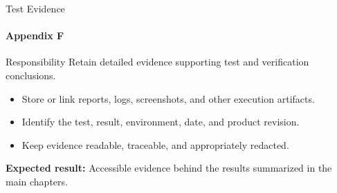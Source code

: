 \begin{frame}{Test Evidence}
\framesubtitle{Appendix F}
\begin{block}{Responsibility}
Retain detailed evidence supporting test and verification conclusions.
\end{block}
\begin{itemize}
  \item Store or link reports, logs, screenshots, and other execution artifacts.
  \item Identify the test, result, environment, date, and product revision.
  \item Keep evidence readable, traceable, and appropriately redacted.
\end{itemize}
\vspace{0.15cm}
\textbf{Expected result:} Accessible evidence behind the results summarized in the main chapters.
\end{frame}
